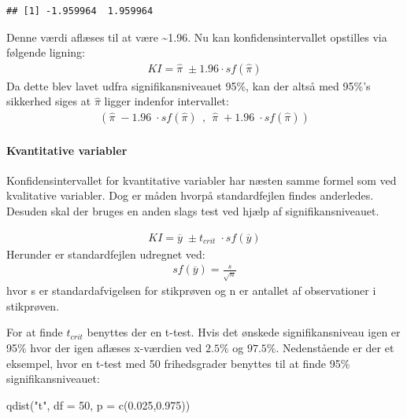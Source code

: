 \documentclass[
]{article}
\newenvironment{Shaded}{\begin{snugshade}}{\end{snugshade}}
\newcommand{\AttributeTok}[1]{\textcolor[rgb]{0.77,0.63,0.00}{#1}}
\newcommand{\DecValTok}[1]{\textcolor[rgb]{0.00,0.00,0.81}{#1}}
\newcommand{\FloatTok}[1]{\textcolor[rgb]{0.00,0.00,0.81}{#1}}
\newcommand{\FunctionTok}[1]{\textcolor[rgb]{0.00,0.00,0.00}{#1}}
\newcommand{\NormalTok}[1]{#1}
\newcommand{\StringTok}[1]{\textcolor[rgb]{0.31,0.60,0.02}{#1}}
\begin{document}
\begin{verbatim}
## [1] -1.959964  1.959964
\end{verbatim}

Denne værdi aflæses til at være \textasciitilde1.96. Nu kan
konfidensintervallet opstilles via følgende ligning: \[
\begin{aligned}
KI = \hat{\pi}\; \pm 1.96\cdot sf(\hat{\pi})
\end{aligned}
\] Da dette blev lavet udfra signifikansniveauet 95\%, kan der altså med
95\%'s sikkerhed siges at \(\hat\pi\) ligger indenfor intervallet: \[
\begin{aligned}
(\hat\pi\;-1.96\;\cdot sf(\hat\pi) \ \ ,\ \  \hat\pi \; + 1.96\;\cdot sf(\hat\pi))
\end{aligned}
\]

\hypertarget{kvantitative-variabler}{%
\paragraph{Kvantitative variabler}\label{kvantitative-variabler}}

Konfidensintervallet for kvantitative variabler har næsten samme formel
som ved kvalitative variabler. Dog er måden hvorpå standardfejlen findes
anderledes. Desuden skal der bruges en anden slags test ved hjælp af
signifikansniveauet.

\[
\begin{aligned}
KI = \overline{y}\;\pm t_{crit} \;\cdot sf(\overline{y})
\end{aligned}
\] Herunder er standardfejlen udregnet ved: \[
\begin{aligned}
sf(\overline{y}) = \frac{s}{\sqrt{n}}
\end{aligned}
\] hvor s er standardafvigelsen for stikprøven og n er antallet af
observationer i stikprøven.

For at finde \(t_{crit}\) benyttes der en t-test. Hvis det ønskede
signifikansniveau igen er 95\% hvor der igen aflæses x-værdien ved
\(2.5\%\) og \(97.5\%\). Nedenstående er der et eksempel, hvor en t-test
med 50 frihedsgrader benyttes til at finde 95\% signifikansniveauet:

\begin{Shaded}
\begin{Highlighting}[]
\FunctionTok{qdist}\NormalTok{(}\StringTok{"t"}\NormalTok{, }\AttributeTok{df =} \DecValTok{50}\NormalTok{, }\AttributeTok{p =} \FunctionTok{c}\NormalTok{(}\FloatTok{0.025}\NormalTok{,}\FloatTok{0.975}\NormalTok{))}
\end{Highlighting}
\end{Shaded}
\end{document}
